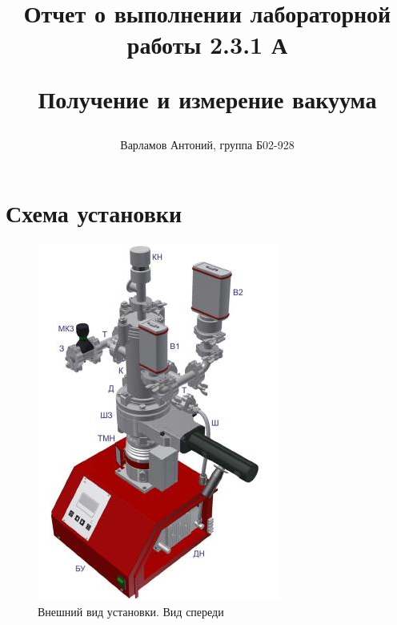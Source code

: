 \documentclass[12pt,a4paper]{article}
\title{
Отчет о выполнении лабораторной работы 2.3.1 А

Получение и измерение вакуума
}
\author{Варламов Антоний, группа Б02-928}
\begin{document}
\maketitle

\newpage


	
	\newpage
	
	\section{Схема установки}
	\begin{figure}[h!]
		\begin{center}
			\begin{minipage}[h]{0.4\linewidth}
				\includegraphics[width=1\linewidth]{scem_of_facility_front}
				\caption{Внешний вид установки. Вид спереди} %

\end{minipage}
\end{center}
\end{figure}
\end{document}

